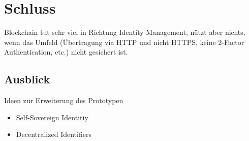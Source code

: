 \section{Schluss}
\label{sec:end}
Blockchain tut sehr viel in Richtung Identity Management, nützt aber nichts, wenn das Umfeld (Übertragung via HTTP und nicht HTTPS, keine 2-Factor Authentication, etc.) nicht gesichert ist.

\subsection{Ausblick}
\label{sec:end_further}
	Ideen zur Erweiterung des Prototypen
	\begin{itemize}
		\item Self-Sovereign Identitiy
		\item Decentralized Identifiers
	\end{itemize}
